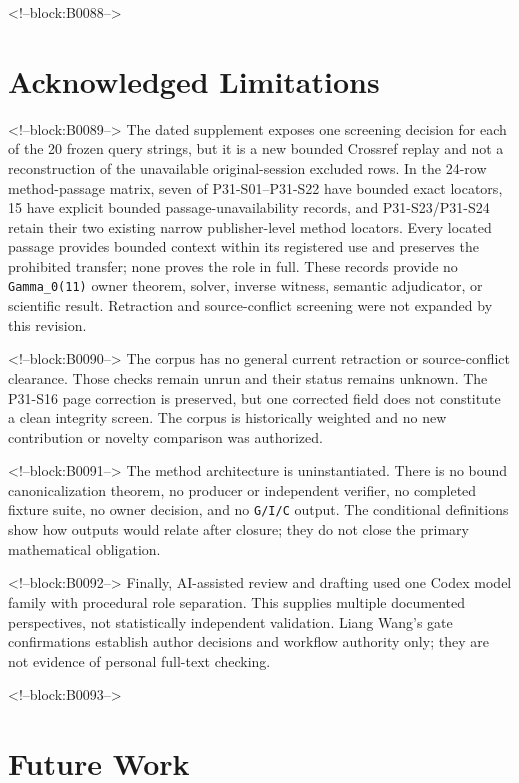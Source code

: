 \documentclass[11pt]{article}
\begin{document}
<!--block:B0088-->
\hypertarget{8-acknowledged-limitations}{%
\section{Acknowledged
Limitations}\label{8-acknowledged-limitations}}

<!--block:B0089-->
The dated supplement exposes one screening decision for each of the 20 frozen
query strings, but it is a new bounded Crossref replay and not a reconstruction
of the unavailable original-session excluded rows. In the 24-row method-passage
matrix, seven of P31-S01--P31-S22 have bounded exact locators, 15 have explicit
bounded passage-unavailability records, and P31-S23/P31-S24 retain their two
existing narrow publisher-level method locators. Every located passage provides
bounded context within its registered use and preserves the prohibited transfer;
none proves the role in full. These records provide no
\texttt{Gamma\_0(11)} owner theorem, solver, inverse witness, semantic adjudicator,
or scientific result. Retraction and source-conflict screening were not expanded
by this revision.

<!--block:B0090-->
The corpus has no general current retraction or source-conflict
clearance. Those checks remain unrun and their status remains unknown.
The P31-S16 page correction is
preserved, but one corrected field does not constitute a clean integrity
screen. The corpus is historically weighted and no new contribution or
novelty comparison was authorized.

<!--block:B0091-->
The method architecture is uninstantiated. There is no bound
canonicalization theorem, no producer or independent verifier, no
completed fixture suite, no owner decision, and no \texttt{G/I/C}
output. The conditional definitions show how outputs would relate after
closure; they do not close the primary mathematical obligation.

<!--block:B0092-->
Finally, AI-assisted review and drafting used one Codex model family
with procedural role separation. This supplies multiple documented
perspectives, not statistically independent validation. Liang Wang's
gate confirmations establish author decisions and workflow authority
only; they are not evidence of personal full-text checking.

<!--block:B0093-->
\hypertarget{9-future-work}{%
\section{Future Work}\label{9-future-work}}
\end{document}
